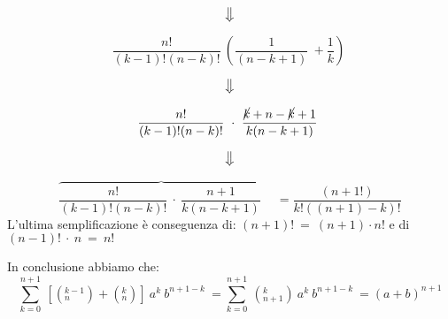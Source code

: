 \documentclass[../rip.tex]{subfiles}
\begin{document}
\begin{dimo}
	\begin{equation*}
	\big\Downarrow
	\end{equation*}
	
	\begin{equation} 
	\frac{n!}{(k-1)!(n-k)!}\ \left( \frac{1}{(n-k+1)}\ + \frac{1}{k} \right)\
	\end{equation}

	\begin{equation*}
	\big\Downarrow
	\end{equation*}
	

	\begin{equation}
	\frac{n!}{(k-1)!(n-k)!}\ \cdot\ 
	\frac{\cancel{k} + n - \cancel{k} + 1}{k (n-k+1)}\
	\end{equation}

	\begin{equation*}
	\big\Downarrow
	\end{equation*}
	
	
	\begin{equation}
	\overbrace{
	\frac{n!}{(k-1)!(n-k)!}\ \cdot\
	\frac{n+1}{k(n-k+1)}\ } \quad =
	\frac{(n+1!)}{k!((n+1)-k)!}
	\end{equation}
L'ultima semplificazione è conseguenza di: $(n+1)!\ =\ (n+1) \cdot n!$
e di $(n-1)!\ \cdot \ n\ =\ n!$

In conclusione abbiamo che:
	\begin{equation}
	\sum_{k=0}^{n+1}\ [(_{n}^{k-1}) + (_{n}^{k})]\ a^{k}\ b^{n+1-k}\ =
	\sum_{k=0}^{n+1}\ (_{n+1}^{k})\ a^{k}\ b^{n+1-k}\ =
	(a + b)^{n+1}
	\end{equation}

\end{dimo}
\end{document}

